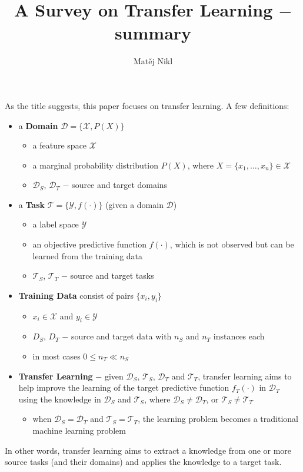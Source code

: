 \documentclass[a4paper,twocolumn]{article}
\title{A Survey on Transfer Learning $-$ summary}
\author{Matěj Nikl}
\newcommand{\D}{\mathcal{D}}
\newcommand{\T}{\mathcal{T}}
\newcommand{\X}{\mathcal{X}}
\newcommand{\Y}{\mathcal{Y}}
\begin{document}
\maketitle
\noindent
As the title suggests, this paper focuses on transfer learning.
A few definitions:

\begin{itemize}
    \item a \textbf{Domain} $\D = \{\X, P(X)\}$
        \begin{itemize}
            \item a feature space $\X$
            \item a marginal probability distribution $P(X)$, where $X = \{x_1, \ldots, x_n\} \in \X$
            \item $\D_S$, $\D_T$ $-$ source and target domains
        \end{itemize}
    \item a \textbf{Task} $\T = \{\Y, f(\cdot)\}$ (given a domain $\D$)
        \begin{itemize}
            \item a label space $\Y$
            \item an objective predictive function $f(\cdot)$, which is not observed but can be learned from the training data
            \item $\T_S$, $\T_T$ $-$ source and target tasks
        \end{itemize}
    \item \textbf{Training Data} consist of pairs $\{x_i, y_i\}$
        \begin{itemize}
            \item $x_i \in \X$ and $y_i \in \Y$
            \item $D_S$, $D_T$ $-$ source and target data with $n_S$ and $n_T$ instances each
            \item in most cases $0 \le n_T \ll n_S$
        \end{itemize}
    \item \textbf{Transfer Learning} $-$ given $\D_S$, $\T_S$, $\D_T$ and $\T_T$, transfer learning aims to help improve the learning of the target predictive function $f_T(\cdot)$ in $\D_T$ using the knowledge in $\D_S$ and $\T_S$, where $\D_S \ne \D_T$, or $\T_S \ne \T_T$
        \begin{itemize}
            \item when $\D_S = \D_T$ and $\T_S = \T_T$, the learning problem becomes a traditional machine learning problem
        \end{itemize}
\end{itemize}
In other words, transfer learning aims to extract a knowledge from one or more source tasks (and their domains) and applies the knowledge to a target task.
\end{document}
